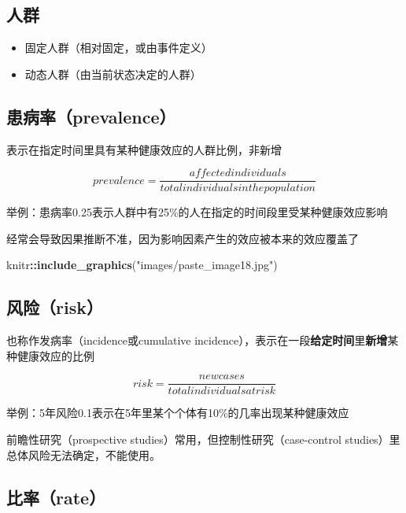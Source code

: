 \documentclass[]{book}
\newenvironment{Shaded}{\begin{snugshade}}{\end{snugshade}}
\newcommand{\KeywordTok}[1]{\textcolor[rgb]{0.13,0.29,0.53}{\textbf{#1}}}
\newcommand{\NormalTok}[1]{#1}
\newcommand{\OperatorTok}[1]{\textcolor[rgb]{0.81,0.36,0.00}{\textbf{#1}}}
\newcommand{\StringTok}[1]{\textcolor[rgb]{0.31,0.60,0.02}{#1}}
\providecommand{\tightlist}{%
  \setlength{\itemsep}{0pt}\setlength{\parskip}{0pt}}
\begin{document}
\hypertarget{ux4ebaux7fa4}{%
\subsection{人群}\label{ux4ebaux7fa4}}

\begin{itemize}
\tightlist
\item
  固定人群（相对固定，或由事件定义）
\item
  动态人群（由当前状态决定的人群）
\end{itemize}

\hypertarget{ux60a3ux75c5ux7387prevalence}{%
\subsection{患病率（prevalence）}\label{ux60a3ux75c5ux7387prevalence}}

表示在指定时间里具有某种健康效应的人群比例，非新增

\[prevalence = \frac{affected individuals}{total individuals in the population}\]

举例：患病率0.25表示人群中有25\%的人在指定的时间段里受某种健康效应影响

经常会导致因果推断不准，因为影响因素产生的效应被本来的效应覆盖了

\begin{Shaded}
\begin{Highlighting}[]
\NormalTok{knitr}\OperatorTok{::}\KeywordTok{include_graphics}\NormalTok{(}\StringTok{"images/paste_image18.jpg"}\NormalTok{)}
\end{Highlighting}
\end{Shaded}

\hypertarget{ux98ceux9669risk}{%
\subsection{风险（risk）}\label{ux98ceux9669risk}}

也称作发病率（incidence或cumulative incidence），表示在一段\textbf{给定时间}里\textbf{新增}某种健康效应的比例

\[risk = \frac{new cases}{total individuals at risk}\]

举例：5年风险0.1表示在5年里某个个体有10\%的几率出现某种健康效应

前瞻性研究（prospective studies）常用，但控制性研究（case-control studies）里总体风险无法确定，不能使用。

\hypertarget{ux6bd4ux7387rate}{%
\subsection{比率（rate）}\label{ux6bd4ux7387rate}}
\end{document}
